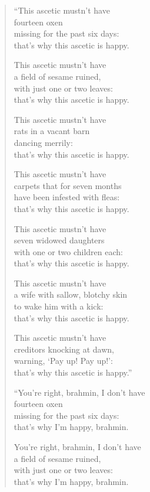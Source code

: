 \documentclass[12pt,openany]{book}%
\begin{document}
\begin{verse}%
“This ascetic mustn’t have \\
fourteen oxen \\
missing for the past six days: \\
that’s why this ascetic is happy. 

This ascetic mustn’t have \\
a field of sesame ruined, \\
with just one or two leaves: \\
that’s why this ascetic is happy. 

This ascetic mustn’t have \\
rats in a vacant barn \\
dancing merrily: \\
that’s why this ascetic is happy. 

This ascetic mustn’t have \\
carpets that for seven months \\
have been infested with fleas: \\
that’s why this ascetic is happy. 

This ascetic mustn’t have \\
seven widowed daughters \\
with one or two children each: \\
that’s why this ascetic is happy. 

This ascetic mustn’t have \\
a wife with sallow, blotchy skin \\
to wake him with a kick: \\
that’s why this ascetic is happy. 

This ascetic mustn’t have \\
creditors knocking at dawn, \\
warning, ‘Pay up! Pay up!’: \\
that’s why this ascetic is happy.” 

“You’re right, brahmin, I don’t have \\
fourteen oxen \\
missing for the past six days: \\
that’s why I’m happy, brahmin. 

You’re right, brahmin, I don’t have \\
a field of sesame ruined, \\
with just one or two leaves: \\
that’s why I’m happy, brahmin. 


\end{verse}
\end{document}
